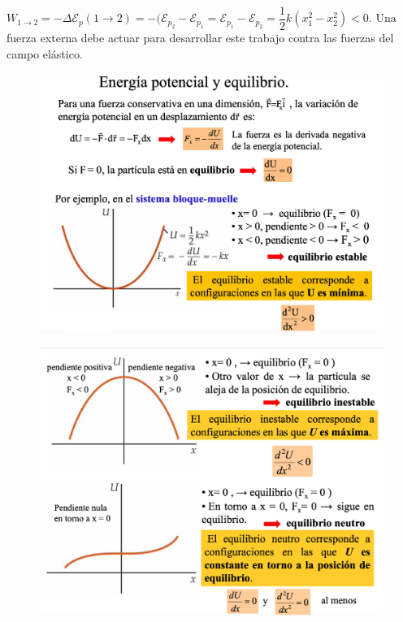 $W_{1 \to 2}=-\Delta \mathcal E_p (1 \to 2)=-(\mathcal E_{p_2}-\mathcal E_{p_1}=\mathcal E_{p_1}-\mathcal E_{p_2}=\dfrac 1 2 k (x_1^2-x_2^2)<0$. Una fuerza externa debe actuar para desarrollar este trabajo contra las fuerzas del campo elástico.

\vspace{10mm} %
\begin{figure}[H]
	\centering
	\includegraphics[width=.95\textwidth]{imagenes/imagenes03/T03IM50.png}
	\end{figure}
	
\begin{figure}[H]
	\centering
	\includegraphics[width=.95\textwidth]{imagenes/imagenes03/T03IM51.png}
	\end{figure}


